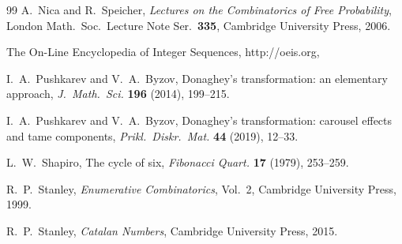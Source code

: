 \documentclass[a4paper,11pt]{article}
\theoremstyle{definition}
\begin{document}
\begin{thebibliography}{99}
A.~Nica and R.~Speicher,
\emph{Lectures on the Combinatorics of Free
Probability},
London Math.\ Soc.\ Lecture Note Ser.\ \textbf{335},
Cambridge University Press, 2006.

{T}he {O}n-{L}ine {E}ncyclopedia of {I}nteger {S}equences, http://oeis.org,

I.~A.~Pushkarev and V.~A.~Byzov,
Donaghey's transformation: an elementary approach,
\emph{J.\ Math.\ Sci.} \textbf{196} (2014), 199--215.

I.~A.~Pushkarev and V.~A.~Byzov,
Donaghey's transformation: carousel effects and tame
components,
\emph{Prikl.\ Diskr.\ Mat.} \textbf{44} (2019),
12--33.

L.~W.~Shapiro,
The cycle of six,
\emph{Fibonacci Quart.} \textbf{17} (1979), 253--259.

R.~P.~Stanley,
\emph{Enumerative Combinatorics}, Vol.~2,
Cambridge University Press, 1999.

R.~P.~Stanley,
\emph{Catalan Numbers},
Cambridge University Press, 2015.

\end{thebibliography}
\end{document}

